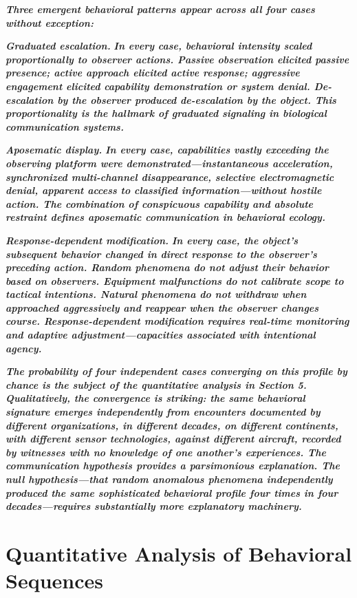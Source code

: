\documentclass[11pt,letterpaper]{article}
\begin{document}
\textbf{\textit{Three emergent behavioral patterns appear across all four cases without exception:}}


\textbf{\textit{Graduated escalation.}}\textbf{\textit{ In every case, behavioral intensity scaled proportionally to observer actions. Passive observation elicited passive presence; active approach elicited active response; aggressive engagement elicited capability demonstration or system denial. De-escalation by the observer produced de-escalation by the object. This proportionality is the hallmark of graduated signaling in biological communication systems.}}


\textbf{\textit{Aposematic display.}}\textbf{\textit{ In every case, capabilities vastly exceeding the observing platform were demonstrated---instantaneous acceleration, synchronized multi-channel disappearance, selective electromagnetic denial, apparent access to classified information---without hostile action. The combination of conspicuous capability and absolute restraint defines aposematic communication in behavioral ecology.}}


\textbf{\textit{Response-dependent modification.}}\textbf{\textit{ In every case, the object's subsequent behavior changed in direct response to the observer's preceding action. Random phenomena do not adjust their behavior based on observers. Equipment malfunctions do not calibrate scope to tactical intentions. Natural phenomena do not withdraw when approached aggressively and reappear when the observer changes course. Response-dependent modification requires real-time monitoring and adaptive adjustment---capacities associated with intentional agency.}}


\textbf{\textit{The probability of four independent cases converging on this profile by chance is the subject of the quantitative analysis in Section 5. Qualitatively, the convergence is striking: the same behavioral signature emerges independently from encounters documented by different organizations, in different decades, on different continents, with different sensor technologies, against different aircraft, recorded by witnesses with no knowledge of one another's experiences. The communication hypothesis provides a parsimonious explanation. The null hypothesis---that random anomalous phenomena independently produced the same sophisticated behavioral profile four times in four decades---requires substantially more explanatory machinery.}}


\section{Quantitative Analysis of Behavioral Sequences}
\end{document}
